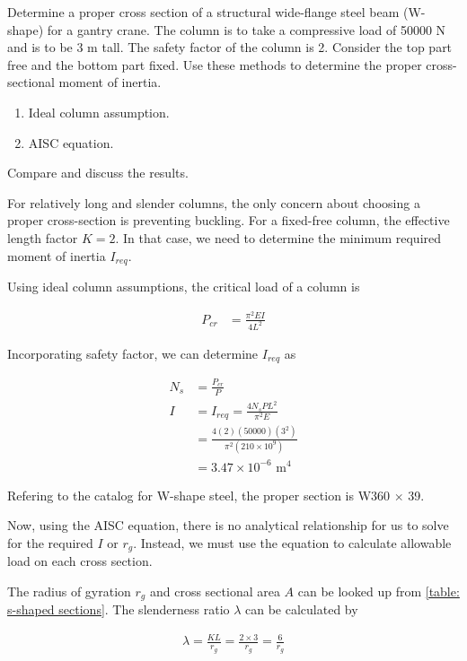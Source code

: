 \documentclass[
10pt,
a4paper,
openany,
svgnames,
]{book}
\begin{document}
\begin{example}
  Determine a proper cross section of a structural wide-flange steel beam (W-shape) for a gantry crane. The column is to take a compressive load of 50000 N and is to be 3 m tall. The safety factor of the column is 2. Consider the top part free and the bottom part fixed. Use these methods to determine the proper cross-sectional moment of inertia.
  \begin{enumerate}
  \item Ideal column assumption.
  \item AISC equation.
  \end{enumerate}
  Compare and discuss the results.
\end{example}
\begin{solution}
  For relatively long and slender columns, the only concern about choosing a proper cross-section is preventing buckling. For a fixed-free column, the effective length factor $K = 2$. In that case, we need to determine the minimum required moment of inertia $I_{req}$.

  Using ideal column assumptions, the critical load of a column is

  \begin{align*}
    P_{cr} &= \frac{\pi^2 EI}{4L^2}
  \end{align*}

  Incorporating safety factor, we can determine $I_{req}$ as
  
  \begin{align*}
    N_s &= \frac{P_{cr}}{P} \\
    I &= I_{req} = \frac{4 N_s P L^2}{\pi^2 E} \\
        &= \frac{4(2)(50000)(3^2)}{\pi^2 (210 \times 10^9)} \\
        &= 3.47 \times 10^{-6} \text{ m}^4
  \end{align*}

  Refering to the catalog for W-shape steel, the proper section is W360 $\times$ 39.

  Now, using the AISC equation, there is no analytical relationship for us to solve for the required $I$ or $r_g$. Instead, we must use the equation to calculate allowable load on each cross section.

  The radius of gyration $r_g$ and cross sectional area $A$ can be looked up from \cref{table: s-shaped sections}. The slenderness ratio $\lambda$ can be calculated by 

  \begin{align*}
    \lambda = \frac{KL}{r_g} = \frac{2 \times 3}{r_g} = \frac{6}{r_g}
  \end{align*}


\end{solution}
\end{document}
